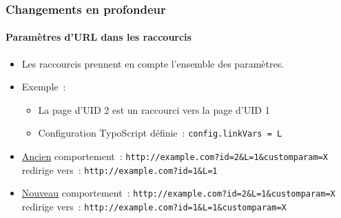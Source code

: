 \begin{frame}[fragile]
	\frametitle{Changements en profondeur}
	\framesubtitle{Paramètres d'URL dans les raccourcis}

	\begin{itemize}
		\item Les raccourcis prennent en compte l'ensemble des paramètres.
		\item Exemple~:

			\begin{itemize}
				\item La page d'UID 2 est un raccourci vers la page d'UID 1
				\item Configuration TypoScript définie~: \texttt{config.linkVars = L}
			\end{itemize}

		\item \underline{Ancien} comportement~:\newline
			\smaller
				\tabto{0.5cm}\texttt{http://example.com?id=2\&L=1\&customparam=X}\newline
				redirige vers~:\newline
				\tabto{0.5cm}\texttt{http://example.com?id=1\&L=1}
			\normalsize

		\item \underline{Nouveau} comportement~:\newline
			\smaller
				\tabto{0.5cm}\texttt{http://example.com?id=2\&L=1\&customparam=X}\newline
				redirige vers~:\newline
				\tabto{0.5cm}\texttt{http://example.com?id=1\&L=1\&customparam=X}
			\normalsize

	\end{itemize}

\end{frame}


